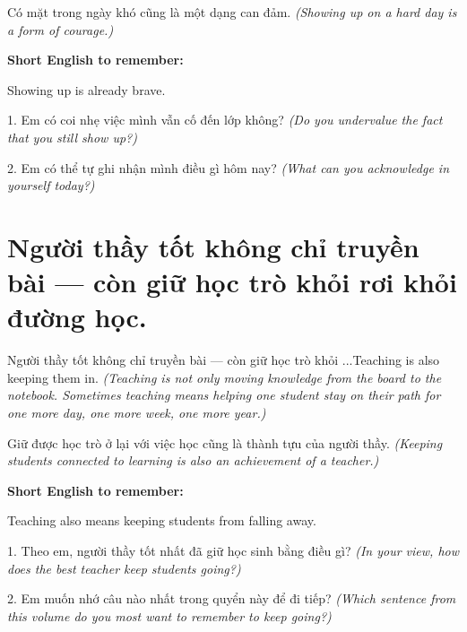\begin{baihoc}
Có mặt trong ngày khó cũng là một dạng can đảm.
\textit{(Showing up on a hard day is a form of courage.)}
\end{baihoc}

\begin{ghinhoanh}
\textbf{Short English to remember:}

Showing up is already brave.

\end{ghinhoanh}

\begin{tuhocnhanh}
1. Em có coi nhẹ việc mình vẫn cố đến lớp không? \textit{(Do you undervalue the fact that you still show up?)}

2. Em có thể tự ghi nhận mình điều gì hôm nay? \textit{(What can you acknowledge in yourself today?)}
\end{tuhocnhanh}
\ngancach


\section{Người thầy tốt không chỉ truyền bài — còn giữ học trò khỏi rơi khỏi đường học.}
\begin{truyen}{Người thầy tốt không chỉ truyền bài — còn giữ học trò khỏi ...}{Teaching is also keeping them in.}
\textit{(Teaching is not only moving knowledge from the board to the notebook. Sometimes teaching means helping one student stay on their path for one more day, one more week, one more year.)}
\end{truyen}

\begin{baihoc}
Giữ được học trò ở lại với việc học cũng là thành tựu của người thầy.
\textit{(Keeping students connected to learning is also an achievement of a teacher.)}
\end{baihoc}

\begin{ghinhoanh}
\textbf{Short English to remember:}

Teaching also means keeping students from falling away.

\end{ghinhoanh}

\begin{tuhocnhanh}
1. Theo em, người thầy tốt nhất đã giữ học sinh bằng điều gì? \textit{(In your view, how does the best teacher keep students going?)}

2. Em muốn nhớ câu nào nhất trong quyển này để đi tiếp? \textit{(Which sentence from this volume do you most want to remember to keep going?)}
\end{tuhocnhanh}
\ngancach


